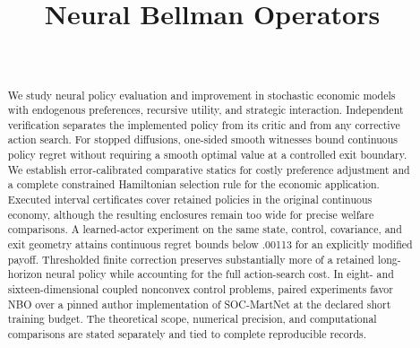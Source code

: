\documentclass[ecta]{econsocart}
\theoremstyle{remark}
\begin{document}
\begin{frontmatter}
\title{Neural Bellman Operators}
\begin{aug}
\author[id=au1,addressref={add1}]{~}
\address[id=add1]{}
\end{aug}
\begin{abstract}
We study neural policy evaluation and improvement in stochastic economic models with endogenous preferences, recursive utility, and strategic interaction. Independent verification separates the implemented policy from its critic and from any corrective action search. For stopped diffusions, one-sided smooth witnesses bound continuous policy regret without requiring a smooth optimal value at a controlled exit boundary. We establish error-calibrated comparative statics for costly preference adjustment and a complete constrained Hamiltonian selection rule for the economic application. Executed interval certificates cover retained policies in the original continuous economy, although the resulting enclosures remain too wide for precise welfare comparisons. A learned-actor experiment on the same state, control, covariance, and exit geometry attains continuous regret bounds below .00113 for an explicitly modified payoff. Thresholded finite correction preserves substantially more of a retained long-horizon neural policy while accounting for the full action-search cost. In eight- and sixteen-dimensional coupled nonconvex control problems, paired experiments favor NBO over a pinned author implementation of SOC-MartNet at the declared short training budget. The theoretical scope, numerical precision, and computational comparisons are stated separately and tied to complete reproducible records.
\end{abstract}
\begin{keyword}
\end{keyword}
\end{frontmatter}

\begin{appendix}

\end{appendix}

\end{document}

